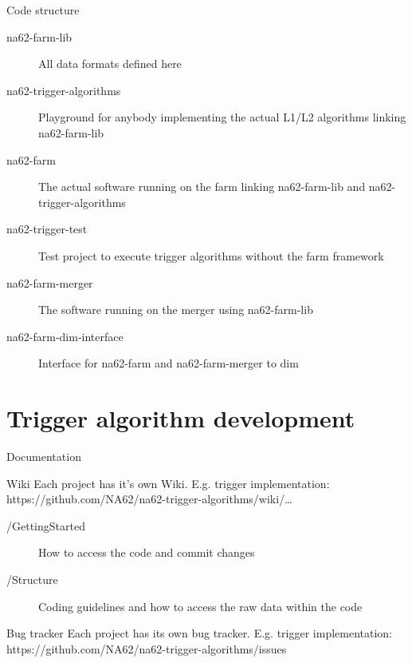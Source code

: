 \begin{frame}{Code structure}{}
	\begin{description}
  		\item[na62-farm-lib] All data formats defined here

  		\item[na62-trigger-algorithms] Playground for anybody implementing the
  		actual L1/L2 algorithms linking na62-farm-lib

  		\item[na62-farm] The actual software running on the farm linking na62-farm-lib
  		and na62-trigger-algorithms
  		
	  	\item[na62-trigger-test] Test project to execute trigger algorithms without
	  	the farm framework

  		\item[na62-farm-merger] The software running on the merger using
  		na62-farm-lib

  		\item[na62-farm-dim-interface] Interface for na62-farm and na62-farm-merger
  		to dim
  		 
	\end{description}
\end{frame}

\section*{Trigger algorithm development}

\begin{frame}{Documentation}{}
		\begin{block}{Wiki}
		Each project has it's own Wiki. E.g. trigger implementation:
		https://github.com/NA62/na62-trigger-algorithms/wiki/\ldots
		\begin{description}
  			\item[/GettingStarted] How to access the code and commit changes
  			
  			\item[/Structure] Coding guidelines and how to access the raw data within
  			the code
		\end{description}
	\end{block}
		
	\begin{block}{Bug tracker}
		Each project has its own bug tracker. E.g. trigger implementation:
		https://github.com/NA62/na62-trigger-algorithms/issues
	\end{block}
\end{frame}

